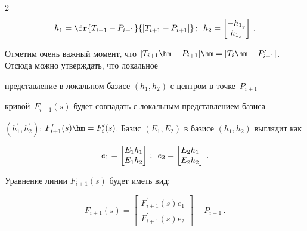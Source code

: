 \begin{multicols}{2}
$$


h_1= \fr{T_{i+1}-P_{i+1}}{\vert T_{i+1} -P_{i+1}\vert}\,;\enskip


h_2= \begin{bmatrix}


-h_{1_y}\\ h_{1_x}


\end{bmatrix}\,.


$$


Отметим очень важный момент, что $\vert T_{i+1}\hm- P_{i+1}\vert \hm= \vert 


T_i\hm- P^\prime_{i+1}\vert$. Отсюда можно утверждать, что локальное 


представление в локальном базисе $(h_1, h_2)$ с центром в точке~$P_{i+1}$ 


кривой~$F_{i+1}(s)$ будет совпадать с локальным представлением базиса 


$(h_1^\prime, h_2^\prime)$: $F^\prime_{i+1}(s)\hm= F_i^\prime(s)$. Базис $(E_1, 


E_2)$ в базисе $(h_1, h_2)$ выглядит как


$$


e_1= \begin{bmatrix}


E_1  h_1\\


E_1  h_2\end{bmatrix}\,;\enskip


e_2= \begin{bmatrix}


E_2  h_1\\


E_2 h_2\end{bmatrix}\,.


$$


Уравнение линии $F_{i+1}(s)$ будет иметь вид:


$$


F_{i+1}(s) = \begin{bmatrix} F^\prime_{i+1}(s) e_1\\[3pt]


F^\prime_{i+1}(s) e_2\end{bmatrix}


+P_{i+1}\,.


$$












\end{multicols}
